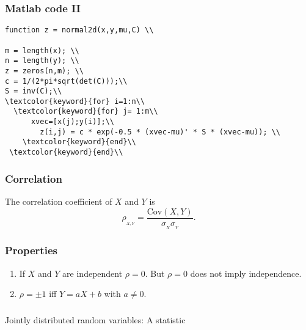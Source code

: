 \begin{frame}[fragile]\frametitle{Matlab code II}



\begin{lstlisting}
function z = normal2d(x,y,mu,C) \\
     
m = length(x); \\
n = length(y); \\
z = zeros(n,m); \\
c = 1/(2*pi*sqrt(det(C)));\\
S = inv(C);\\
\textcolor{keyword}{for} i=1:n\\
  \textcolor{keyword}{for} j= 1:m\\
      xvec=[x(j);y(i)];\\
        z(i,j) = c * exp(-0.5 * (xvec-mu)' * S * (xvec-mu)); \\
    \textcolor{keyword}{end}\\
 \textcolor{keyword}{end}\\
\end{lstlisting}

\end{frame}


\begin{frame}[fragile]\frametitle{Correlation}

\begin{defn}
The correlation coefficient of $X$ and $Y$ is
$$\rho_{_{X,Y}} = \frac{\mbox{Cov}(X,Y)}{\sigma_{_X} \sigma_{_Y}}.$$
\end{defn}
\end{frame}


\begin{frame}[fragile]\frametitle{Properties}

\begin{prop}
\begin{enumerate}
\item If $X$ and $Y$ are independent $\rho = 0$. But $\rho=0$ 
does not imply independence. 

\item $\rho = \pm 1$ iff $Y=aX+b$ with $a \neq 0$.
\end{enumerate}
\end{prop}
\end{frame}


\begin{frame}[fragile]\frametitle{}
\begin{center}
{\Large Jointly distributed random variables: A statistic}

\end{center}
\end{frame}




